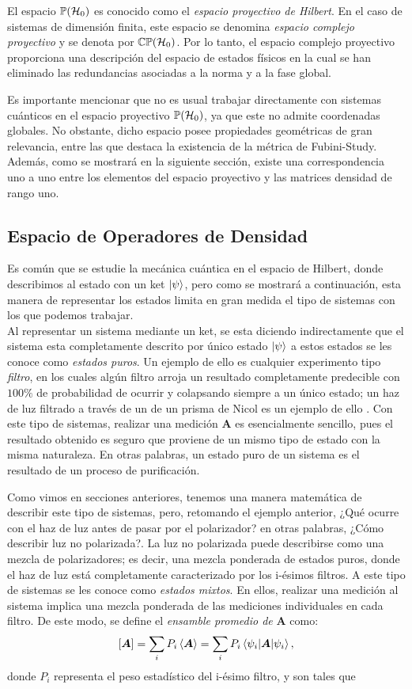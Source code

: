 \documentclass[../Main.tex]{subfiles}
\begin{document}
El espacio $\mathbb{P}(\mathcal{H}_0)$ es conocido como el \emph{espacio proyectivo de Hilbert}.
En el caso de sistemas de dimensión finita, este espacio se denomina
\emph{espacio complejo proyectivo } y se denota por $\mathbb{C} \mathbb{P}(\mathcal{H}_0)$. Por lo tanto, el espacio complejo proyectivo proporciona una descripción del
espacio de estados físicos en la cual se han eliminado las redundancias
asociadas a la norma y a la fase global.


Es importante mencionar que no es usual trabajar directamente con sistemas cuánticos en el espacio proyectivo $\mathbb{P}(\mathcal{H}_0)$, ya que este no admite coordenadas globales. No obstante, dicho espacio posee propiedades geométricas de gran relevancia, entre las que destaca la existencia de la métrica de Fubini-Study. Además, como se mostrará en la siguiente sección, existe una correspondencia uno a uno entre los elementos del espacio proyectivo y las matrices densidad de rango uno.


\subsection{Espacio de Operadores de Densidad}
Es común que se estudie la mecánica cuántica en el espacio de Hilbert, donde describimos al estado con un ket $\ket{\psi}$, pero como se mostrará a continuación, esta manera de representar los estados limita en gran medida el tipo de sistemas con los que podemos trabajar.\\
Al representar un sistema mediante un ket, se esta diciendo indirectamente que el sistema esta completamente descrito por único estado $\ket{\psi}$ a estos estados se les conoce como \emph{estados puros}. Un ejemplo de ello es cualquier experimento tipo \emph{filtro}, en los cuales algún filtro arroja un resultado completamente predecible con $100\%$ de probabilidad de ocurrir y colapsando siempre a un único estado; un haz de luz filtrado a través de un de un prisma de Nicol es un ejemplo de ello \cite{Fano}. Con este tipo de sistemas, realizar una medición $\bm{A}$ es esencialmente sencillo, pues el resultado obtenido es seguro que proviene de un mismo tipo de estado con la misma naturaleza. En otras palabras, un estado puro de un sistema es el resultado de un proceso de purificación.

Como vimos en secciones anteriores, tenemos una manera matemática de describir este tipo de sistemas, pero, retomando el ejemplo anterior, ¿Qué ocurre con el haz de luz antes de pasar por el polarizador? en otras palabras, ¿Cómo describir luz no polarizada?. La luz no polarizada puede describirse como una mezcla de polarizadores; es decir, una mezcla ponderada de estados puros, donde el haz de luz está completamente caracterizado por los i-ésimos filtros. A este tipo de sistemas se les conoce como \emph{estados mixtos}. En ellos, realizar una medición al sistema implica una mezcla ponderada de las mediciones individuales en cada filtro. De este modo, se define el \emph{ensamble promedio de} $\bm{A}$ como:
\begin{equation}
    \qty[\bm{A}]=\sum_i P_i \expval{\bm{A}}=\sum_iP_i\expval{\bm{A}}{\psi_i},
    \label{def:ensamble_promedio}
\end{equation}
donde $P_i$ representa el peso estadístico del i-ésimo filtro, y son tales que
\end{document}
